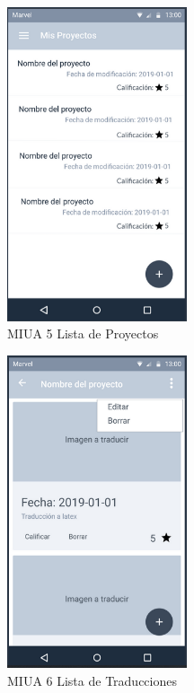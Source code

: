 \begin{figure}[h]
	\centering
	\includegraphics[width=200px]{capitulo4/imagenes/android/MIUA_5.png}
	\caption{MIUA 5 Lista de Proyectos}
	\label{fig:MIUA-5} %
\end{figure}
\newpage
\begin{figure}[H]
	\centering
	\includegraphics[width=200px]{capitulo4/imagenes/android/MIUA_6.png}
	\caption{MIUA 6 Lista de Traducciones}
	\label{fig:MIUA-6} %
\end{figure}
\newpage
